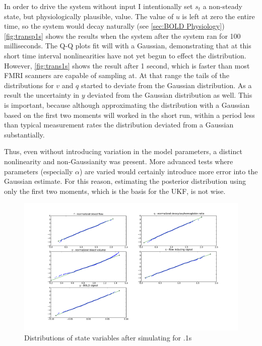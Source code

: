 In order to drive the system without input I intentionally set $s_t$ a non-steady
state, but physiologically plausible, value. The value of $u$ is left at zero 
the entire time, so the 
system would decay naturally (see \autoref{sec:BOLD Physiology})
\autoref{fig:transp1s} shows the results when the system after the
system ran for 100 milliseconds. 
The Q-Q plots fit will with a Gaussian, demonstrating that at this short
time interval nonlinearities have not yet begun to effect the distribution.
However, \autoref{fig:trans1s} shows the result after 1 second, which is faster
than most FMRI scanners are capable of sampling at. At that range the tails 
of the distributions for $v$ and $q$ started to deviate from the
Gaussian distribution. As a result the uncertainty in $y$ deviated from
the Gaussian distribution as well. This is important, because although 
approximating the distribution with a Gaussian based on the first two
moments will worked in the short run, within a period less than typical
measurement rates the distribution deviated from a Gaussian substantially. 

Thus, even without introducing variation in the model parameters,
a distinct nonlinearity and non-Gaussianity was present. 
More advanced tests where parameters (especially $\alpha$) are varied
would certainly introduce more error into the Gaussian estimate. 
For this reason, estimating the posterior distribution using only 
the first two moments, which is the basis for the UKF, is not wise. 

\begin{figure}
\centering
\includegraphics[trim=6cm .75cm 6cm .75cm,width=16cm]{images/gauss_step_point1sec_3sigma.pdf}
\caption{Distributions of state variables after simulating for .1s}
\label{fig:transp1s}
\end{figure}

